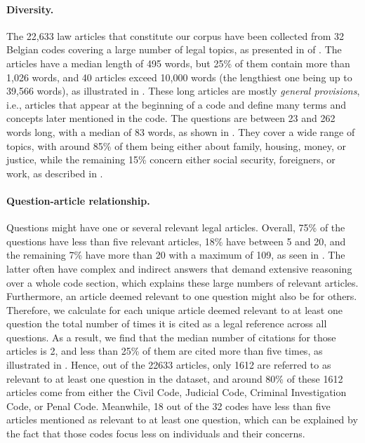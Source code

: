 \documentclass[11pt]{article}
\begin{document}
\paragraph{Diversity.}
The 22,633 law articles that constitute our corpus have been collected from 32 Belgian codes covering a large number of legal topics, as presented in  of . The articles have a median length of 495 words, but 25\% of them contain more than 1,026 words, and 40 articles exceed 10,000 words (the lengthiest one being up to 39,566 words), as illustrated in . These long articles are mostly \textit{general provisions}, i.e., articles that appear at the beginning of a code and define many terms and concepts later mentioned in the code. The questions are between 23 and 262 words long, with a median of 83 words, as shown in . They cover a wide range of topics, with around 85\% of them being either about family, housing, money, or justice, while the remaining 15\% concern either social security, foreigners, or work, as described in .

\paragraph{Question-article relationship.}
Questions might have one or several relevant legal articles. Overall, 75\% of the questions have less than five relevant articles, 18\% have between 5 and 20, and the remaining 7\% have more than 20 with a maximum of 109, as seen in . The latter often have complex and indirect answers that demand extensive reasoning over a whole code section, which explains these large numbers of relevant articles. Furthermore, an article deemed relevant to one question might also be for others. Therefore, we calculate for each unique article deemed relevant to at least one question the total number of times it is cited as a legal reference across all questions. As a result, we find that the median number of citations for those articles is 2, and less than 25\% of them are cited more than five times, as illustrated in . Hence, out of the 22633 articles, only 1612 are referred to as relevant to at least one question in the dataset, and around 80\% of these 1612 articles come from either the Civil Code, Judicial Code, Criminal Investigation Code, or Penal Code. Meanwhile, 18 out of the 32 codes have less than five articles mentioned as relevant to at least one question, which can be explained by the fact that those codes focus less on individuals and their concerns.
\end{document}
